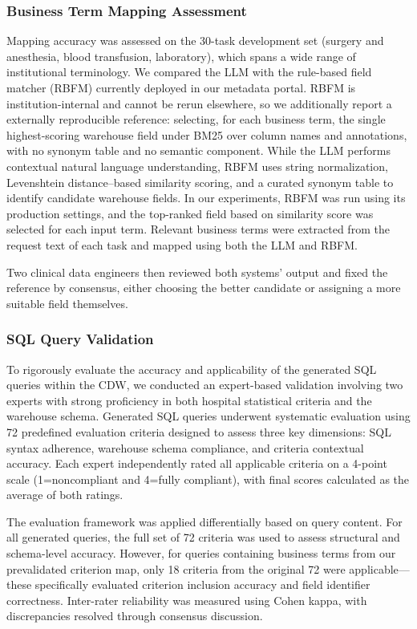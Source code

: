\documentclass[applsci,article,submit,pdftex,oneauthor]{Definitions/mdpi}
\begin{document}
\subsubsection{Business Term Mapping Assessment}
Mapping accuracy was assessed on the 30-task development set (surgery and anesthesia, blood transfusion, laboratory), which spans a wide range of institutional terminology. We compared the LLM with the rule-based field matcher (RBFM) currently deployed in our metadata portal. RBFM is institution-internal and cannot be rerun elsewhere, so we additionally report a externally reproducible reference: selecting, for each business term, the single highest-scoring warehouse field under BM25 over column names and annotations, with no synonym table and no semantic component. While the LLM
performs contextual natural language understanding, RBFM uses string
normalization, Levenshtein distance--based similarity scoring, and a curated
synonym table to identify candidate warehouse fields. In our experiments, RBFM
was run using its production settings, and the top-ranked field based on
similarity score was selected for each input term. Relevant business terms were
extracted from the request text of each task and mapped using both the LLM and
RBFM.

Two clinical data engineers then reviewed both systems' output and fixed the reference by consensus, either choosing the better candidate or assigning a more suitable field themselves.

\subsubsection{SQL Query Validation}
To rigorously evaluate the accuracy and applicability of the generated SQL
queries within the CDW, we conducted an expert-based validation involving two
experts with strong proficiency in both hospital statistical criteria and the
warehouse schema. Generated SQL queries underwent systematic evaluation using 72
predefined evaluation criteria designed to assess three key dimensions: SQL
syntax adherence, warehouse schema compliance, and criteria contextual accuracy.
Each expert independently rated all applicable criteria on a 4-point scale
(1=noncompliant and 4=fully compliant), with final scores calculated as the
average of both ratings.

The evaluation framework was applied differentially based on query content. For
all generated queries, the full set of 72 criteria was used to assess structural
and schema-level accuracy. However, for queries containing business terms from
our prevalidated criterion map, only 18 criteria from the original 72 were
applicable---these specifically evaluated criterion inclusion accuracy and field
identifier correctness. Inter-rater reliability was measured using Cohen kappa,
with discrepancies resolved through consensus discussion.
\end{document}
